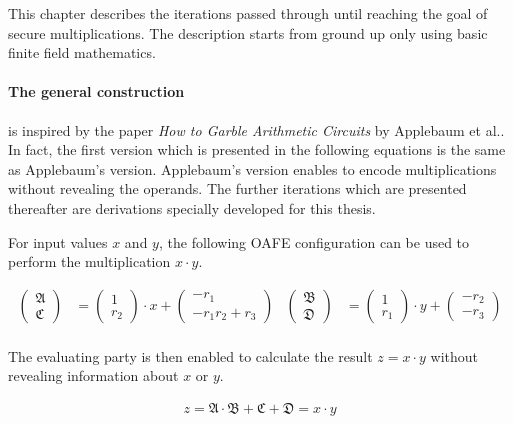 \label{sec:toward-sec-muls}

This chapter describes the iterations passed through until reaching the goal of
secure multiplications. The description starts from ground up only using basic
finite field mathematics.

\paragraph{The general construction} is inspired by the paper \emph{How to
Garble Arithmetic Circuits} by Applebaum et al.\cite{gac2012}. In fact, the
first version which is presented in the following equations is the same as
Applebaum's version. Applebaum's version enables to encode multiplications
without revealing the operands. The further iterations which are presented
thereafter are derivations specially developed for this thesis.

For input values $x$ and $y$, the following OAFE configuration can be used to
perform the multiplication $x \cdot y$.

\begin{align*}
\begin{pmatrix}\mathfrak{A}\\\mathfrak{C}\end{pmatrix} & =
\begin{pmatrix}1\\r_2\end{pmatrix} \cdot x +
\begin{pmatrix}-r_1\\-r_1r_2+r_3\end{pmatrix} &
\begin{pmatrix}\mathfrak{B}\\\mathfrak{D}\end{pmatrix} & =
\begin{pmatrix}1\\r_1\end{pmatrix} \cdot y +
\begin{pmatrix}-r_2\\-r_3\end{pmatrix}\\
\end{align*}

\noindent{}The evaluating party is then enabled to calculate the result $z = x
\cdot y$ without revealing information about $x$ or $y$.

\begin{align*}
  z = \mathfrak{A} \cdot \mathfrak{B} + \mathfrak{C} + \mathfrak{D} =
  x \cdot y\\
\end{align*}

